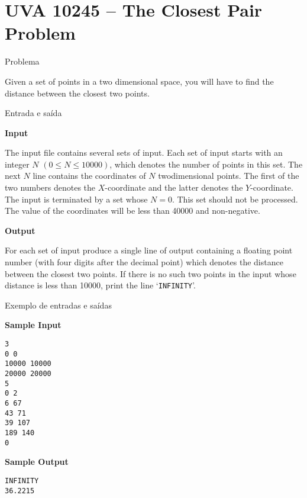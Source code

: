 \section{UVA 10245 -- The Closest Pair Problem}

\begin{frame}[fragile]{Problema}

Given a set of points in a two dimensional space, you will have to find the distance between the closest two points.

\end{frame}

\begin{frame}[fragile]{Entrada e saída}

\textbf{Input}

The input file contains several sets of input. Each set of input starts with an integer 
$N$ $(0\leq N\leq 10000)$, which denotes the number of points in this set. The next $N$ line 
contains the coordinates of $N$ twodimensional points. The first of the two numbers denotes the 
$X$-coordinate and the latter denotes the $Y$-coordinate. The input is terminated by a set whose 
$N = 0$. This set should not be processed. The value of the coordinates will be less than 40000 
and non-negative.

\textbf{Output}

For each set of input produce a single line of output containing a floating point number 
(with four digits after the decimal point) which denotes the distance between the closest two 
points. If there is no such two points in the input whose distance is less than 10000, print the 
line ‘\texttt{INFINITY}’.

\end{frame}

\begin{frame}[fragile]{Exemplo de entradas e saídas}

\begin{minipage}[t]{0.5\textwidth}
\textbf{Sample Input}
\begin{verbatim}
3
0 0
10000 10000
20000 20000
5
0 2
6 67
43 71
39 107
189 140
0
\end{verbatim}
\end{minipage}
\begin{minipage}[t]{0.45\textwidth}
\textbf{Sample Output}
\begin{verbatim}
INFINITY
36.2215
\end{verbatim}
\end{minipage}
\end{frame}

